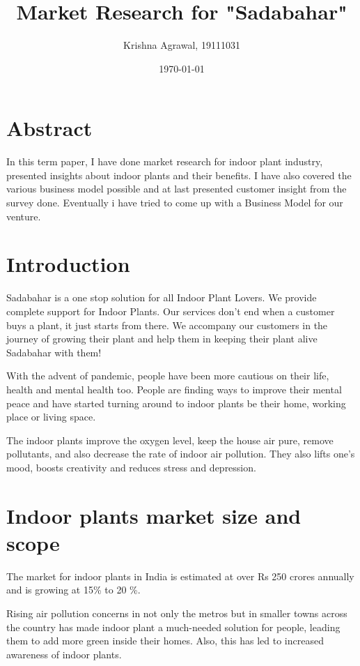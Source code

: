 \documentclass{article}
\title{Market Research for "Sadabahar"}
\author{Krishna Agrawal, 19111031}
\date{\today}
\begin{document}
\maketitle

\section*{Abstract}

In this term paper, I have done market research for indoor plant industry, presented insights about indoor plants and their benefits. I have also covered the various business model possible and at last presented customer insight from the survey done. Eventually i have tried to come up with a Business Model for our venture.


\section*{Introduction}

Sadabahar is a one stop solution for all Indoor Plant Lovers. We provide complete support for Indoor Plants. Our services don't end when a customer buys a plant, it just starts from there. We accompany our customers in the journey of growing their plant and help them in keeping their plant alive Sadabahar with them! 

With the advent of pandemic, people have been more cautious on their life, health and mental health too. People are finding ways to improve their mental peace and have started turning around to indoor plants be their home, working place or living space.
 
The indoor plants improve the oxygen level, keep the house air pure, remove pollutants, and also decrease the rate of indoor air pollution. They also lifts one’s mood, boosts creativity and reduces stress and depression.


\section*{Indoor plants market size and scope}

The market for indoor plants in India is estimated at over Rs 250 crores annually and is growing at 15\% to 20 \%.

Rising air pollution concerns in not only the metros but in smaller towns across the country has made indoor plant a much-needed solution for people, leading them to add more green inside their homes. Also, this has led to increased awareness of indoor plants.
\end{document}
